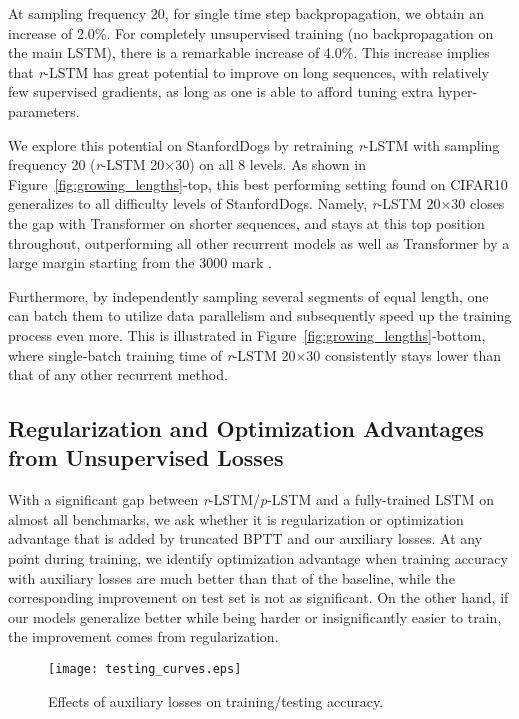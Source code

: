 \documentclass{article}
\newcommand{\rlstm}{{\it r}-LSTM}
\newcommand{\plstm}{{\it p}-LSTM}
\begin{document}
At sampling frequency 20, for single time step backpropagation, we obtain an increase of 2.0\%. For completely unsupervised training (no backpropagation on the main LSTM), there is a remarkable increase of 4.0\%. This increase implies that \rlstm{} has great potential to improve on long sequences, with relatively few supervised gradients, as long as one is able to afford tuning extra hyper-parameters.

We explore this potential on StanfordDogs by retraining \rlstm{} with sampling frequency 20 (\rlstm{} 20$\times$30) on all 8 levels. As shown in Figure~\ref{fig:growing_lengths}-top, this best performing setting found on CIFAR10 generalizes to all difficulty levels of StanfordDogs. Namely, \rlstm{} 20$\times$30 closes the gap with Transformer on shorter sequences, and stays at this top position throughout, outperforming all other recurrent models as well as Transformer by a large margin starting from the 3000 mark .

Furthermore, by independently sampling several segments of equal length, one can batch them to utilize data parallelism and subsequently speed up the training process even more. This is illustrated in Figure~\ref{fig:growing_lengths}-bottom, where single-batch training time of \rlstm{} 20$\times$30 consistently stays lower than that of any other recurrent method.

\subsection{Regularization and Optimization Advantages from Unsupervised Losses} \label{sec:reg_or_opt}

With a significant gap between \rlstm{}/\plstm{} and a fully-trained LSTM on almost all benchmarks, we ask whether it is regularization or optimization advantage that is added by truncated BPTT and our auxiliary losses. At any point during training, we identify optimization advantage when training accuracy with auxiliary losses are much better than that of the baseline, while the corresponding improvement on test set is not as significant. On the other hand, if our models generalize better while being harder or insignificantly easier to train, the improvement comes from regularization.

\begin{figure}[htb]
\texttt{[image: testing\_curves.eps]}
\caption{Effects of auxiliary losses on training/testing accuracy.}
\label{fig:testing_curves}
\end{figure}
\end{document}
